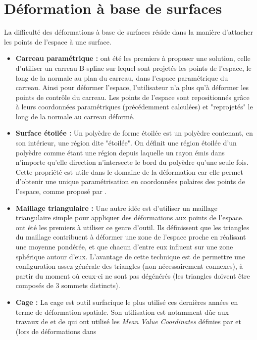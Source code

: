 \section{Déformation à base de surfaces}
La difficulté des déformations à base de surfaces réside dans la
manière d'attacher les points de l'espace à une surface.

\begin{itemize}
\item{\textbf{Carreau paramétrique :}} \cite{JLQ96} ont été les
  premiers à proposer une solution, celle d'utiliser un carreau
  B-spline sur lequel sont projetés les points de l'espace, le long de
  la normale au plan du carreau, dans l'espace paramétrique du
  carreau. Ainsi pour déformer l'espace, l'utilisateur n'a plus qu'à
  déformer les points de contrôle du carreau. Les points de l'espace
  sont repositionnés grâce à leurs coordonnées paramétriques
  (précédemment calculées) et "reprojetés" le long de la normale au
  carreau déformé.
\item{\textbf{Surface étoilée :}} Un polyèdre de forme étoilée est un
  polyèdre contenant, en son intérieur, une région dite "étoilée". On
  définit une région étoilée d'un polyèdre comme étant une région
  depuis laquelle un rayon émis dans n'importe qu'elle direction
  n'intersecte le bord du polyèdre qu'une seule fois. Cette propriété
  est utile dans le domaine de la déformation car elle permet
  d'obtenir une unique paramétrisation en coordonnées polaires des
  points de l'espace, comme proposé par \cite{JL00}.
\item{\textbf{Maillage triangulaire :}} Une autre idée est d'utiliser
  un maillage triangulaire simple pour appliquer des déformations aux
  points de l'espace. \cite{KO03} ont été les premiers à utiliser ce
  genre d'outil. Ils définissent que les triangles du maillage
  contribuent à déformer une zone de l'espace proche en réalisant une
  moyenne pondérée, et que chacun d'entre eux influent sur une zone
  sphérique autour d'eux. L'avantage de cette technique est de
  permettre une configuration assez générale des triangles (non
  nécessairement connexes), à partir du moment où ceux-ci ne sont pas
  dégénérés (les triangles doivent être composés de 3 sommets
  distincts).
\item{\textbf{Cage :}} La cage est outil surfacique le plus utilisé
  ces dernières années en terme de déformation spatiale. Son
  utilisation est notamment dûe aux travaux de \cite{JSW05} et de
  \cite{HF06} qui ont utilisé les \textit{Mean Value Coordinates}
  définies par \cite{Flo03} et \cite{FKR05} (lors de déformations dans

\end{itemize}
